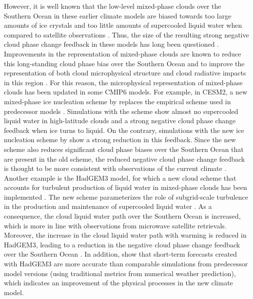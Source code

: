 However, it is well known that the low-level mixed-phase clouds over the
Southern Ocean in these earlier climate models are biased towards too large
amounts of ice crystals and too little amounts of supercooled liquid water when
compared to satellite observations \autocite{BodasSalcedo2016}. Thus, the size
of the resulting strong negative cloud phase change feedback in these models
has long been questioned \autocite{McCoy2015, Tan2016}. Improvements in the
representation of mixed-phase clouds are known to reduce this long-standing
cloud phase bias over the Southern Ocean \autocite{BodasSalcedo2016, McCoy2016}
and to improve the representation of both cloud microphysical structure and
cloud radiative impacts in this region \autocite{Hyder2018, Kay2016}. For this
reason, the microphysical representation of mixed-phase clouds has been updated
in some \acs{CMIP}6 models. For example, in \acs{CESM}2, a new mixed-phase ice
nucleation scheme by \textcite{Hoose2010} replaces the \textcite{Meyers1992}
empirical scheme used in predecessor models \autocite{Gettelman2019}.
Simulations with the \textcite{Meyers1992} scheme show almost no supercooled
liquid water in high-latitude clouds and a strong negative cloud phase change
feedback when ice turns to liquid. On the contrary, simulations with the new
ice nucleation scheme by \textcite{Hoose2010} show a strong reduction in this
feedback. Since the new scheme also reduces significant cloud phase biases over
the Southern Ocean that are present in the old scheme, the reduced negative
cloud phase change feedback is thought to be more consistent with observations
of the current climate \autocite{Gettelman2019}. Another example is the
\acs{HadGEM}3 model, for which a new cloud scheme that accounts for turbulent
production of liquid water in mixed-phase clouds has been implemented
\autocite{BodasSalcedo2019}. The new scheme parameterizes the role of
subgrid-scale turbulence in the production and maintenance of supercooled
liquid water \autocite{Furtado2016}. As a consequence, the cloud liquid water
path over the Southern Ocean is increased, which is more in line with
observations from microwave satellite retrievals. Moreover, the increase in the
cloud liquid water path with warming is reduced in \acs{HadGEM}3, leading to a
reduction in the negative cloud phase change feedback over the Southern Ocean
\autocite{BodasSalcedo2019}. In addition, \textcite{Williams2020} show that
short-term forecasts created with \acs{HadGEM}3 are more accurate than
comparable simulations from predecessor model versions (using traditional
metrics from numerical weather prediction), which indicates an improvement of
the physical processes in the new climate model.


